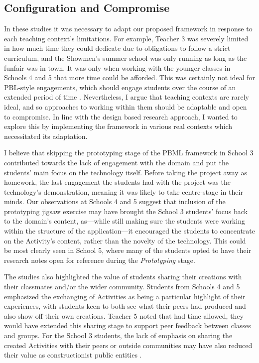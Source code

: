 \subsection{Configuration and Compromise}
In these studies it was necessary to adapt our proposed framework in response to each teaching context's limitations. For example, Teacher 3 was severely limited in how much time they could dedicate due to obligations to follow a strict curriculum, and the Showmen's summer school was only running as long as the funfair was in town. It was only when working with the younger classes in Schools 4 and 5 that more time could be afforded. This was certainly not ideal for PBL-style engagements, which should engage students over the course of an extended period of time \citep{Blumenfeld1991}. Nevertheless, I argue that teaching contexts are rarely ideal, and so approaches to working within them should be adaptable and open to compromise. In line with the design based research approach, I wanted to explore this by implementing the framework in various real contexts which necessitated its adaptation.

I believe that skipping the prototyping stage of the PBML framework in School 3 contributed towards the lack of engagement with the domain and put the students' main focus on the technology itself. Before taking the project away as homework, the last engagement the students had with the project was the technology's demonstration, meaning it was likely to take centre-stage in their minds. Our observations at Schools 4 and 5 suggest that inclusion of the prototyping jigsaw exercise may have brought the School 3 students' focus back to the domain's content, as---while still making sure the students were working within the structure of the application---it encouraged the students to concentrate on the Activity's content, rather than the novelty of the technology. This could be most clearly seen in School 5, where many of the students opted to have their research notes open for reference during the \textit{Prototyping} stage.

The studies also highlighted the value of students sharing their creations with their classmates and/or the wider community. Students from Schools 4 and 5 emphasized the exchanging of Activities as being a particular highlight of their experiences, with students keen to both see what their peers had produced and also show off their own creations. Teacher 5 noted that had time allowed, they would have extended this sharing stage to support peer feedback between classes and groups. For the School 3 students, the lack of emphasis on sharing the created Activities with their peers or outside communities may have also reduced their value as constructionist public entities \citep{PapertSeymourandHarel1991a}.


